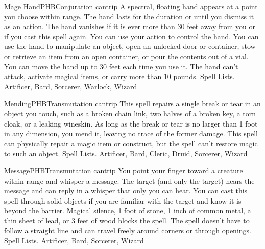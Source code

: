 \begin{spell}{Mage Hand}{PHB}{Conjuration cantrip}
{
}
A spectral, floating hand appears at a point you choose within range. The hand lasts for the duration or until you dismiss it as an action. The hand vanishes if it is ever more than 30 feet away from you or if you cast this spell again.
You can use your action to control the hand. You can use the hand to manipulate an object, open an unlocked door or container, stow or retrieve an item from an open container, or pour the contents out of a vial. You can move the hand up to 30 feet each time you use it.
The hand can’t attack, activate magical items, or carry more than 10 pounds.
Spell Lists. Artificer, Bard, Sorcerer, Warlock, Wizard
\end{spell}

\begin{spell}{Mending}{PHB}{Transmutation cantrip}
{
}
This spell repairs a single break or tear in an object you touch, such as a broken chain link, two halves of a broken key, a torn cloak, or a leaking wineskin. As long as the break or tear is no larger than 1 foot in any dimension, you mend it, leaving no trace of the former damage.
This spell can physically repair a magic item or construct, but the spell can’t restore magic to such an object.
Spell Lists. Artificer, Bard, Cleric, Druid, Sorcerer, Wizard
\end{spell}

\begin{spell}{Message}{PHB}{Transmutation cantrip}
{
}
You point your finger toward a creature within range and whisper a message. The target (and only the target) hears the message and can reply in a whisper that only you can hear.
You can cast this spell through solid objects if you are familiar with the target and know it is beyond the barrier. Magical silence, 1 foot of stone, 1 inch of common metal, a thin sheet of lead, or 3 feet of wood blocks the spell. The spell doesn’t have to follow a straight line and can travel freely around corners or through openings.
Spell Lists. Artificer, Bard, Sorcerer, Wizard
\end{spell}

